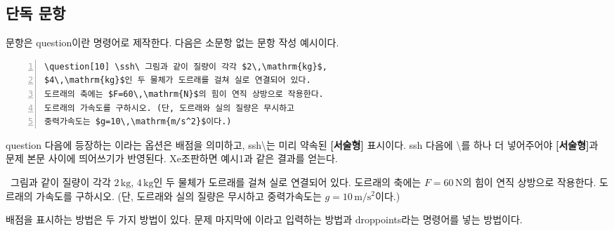 \documentclass[]{gshs_exam_S}
\begin{document}
\begin{multicols*}{2}

\subsection{단독 문항}
문항은 {\ttfamily{\textbackslash}question}이란 명령어로 제작한다. 다음은 소문항 없는 문항 작성 예시이다.
\begin{Verbatim}[frame=single,fontsize=\footnotesize,numbers=left,xleftmargin=5mm]
\question[10] \ssh\ 그림과 같이 질량이 각각 $2\,\mathrm{kg}$, 
$4\,\mathrm{kg}$인 두 물체가 도르래를 걸쳐 실로 연결되어 있다.
도르래의 축에는 $F=60\,\mathrm{N}$의 힘이 연직 상방으로 작용한다. 
도르래의 가속도를 구하시오. (단, 도르래와 실의 질량은 무시하고
중력가속도는 $g=10\,\mathrm{m/s^2}$이다.)
\end{Verbatim}
{\ttfamily{\textbackslash}question} 다음에 등장하는 {\ttfamily [10]}이라는 옵션은 배점을 의미하고, {\ttfamily{\textbackslash}ssh{\textbackslash}}는 미리 약속된 \textbf{[서술형]} 표시이다. {\ttfamily{\textbackslash}ssh} 다음에 {\ttfamily\textbackslash}를 하나 더 넣어주어야 \textbf{[서술형]}과 문제 본문 사이에 띄어쓰기가 반영된다. Xe 조판하면 예시1과 같은 결과를 얻는다.
\par\vspace{1em}\noindent{}\vspace{-1em}
\begin{questions}\extrawidth{8.1em}
\question[10] \ssh\ 그림과 같이 질량이 각각 $2\,\mathrm{kg}$, $4\,\mathrm{kg}$인 두 물체가 도르래를 걸쳐 실로 연결되어 있다. 도르래의 축에는 $F=60\,\mathrm{N}$의 힘이 연직 상방으로 작용한다. 도르래의 가속도를 구하시오. (단, 도르래와 실의 질량은 무시하고 중력가속도는 $g=10\,\mathrm{m/s^2}$이다.)
\end{questions}
\vspace{-1.4em}\noindent{}
배점을 표시하는 방법은 두 가지 방법이 있다. 문제 마지막에 {\ttfamily[10점]}이라고 입력하는 방법과 {\ttfamily{\textbackslash}droppoints}라는 명령어를 넣는 방법이다.
\par\vspace{1em}\noindent{}\vspace{-1em}
\begin{questions}\extrawidth{8.1em}\setcounter{question}{0}

\end{questions}
\end{multicols*}
\end{document}

